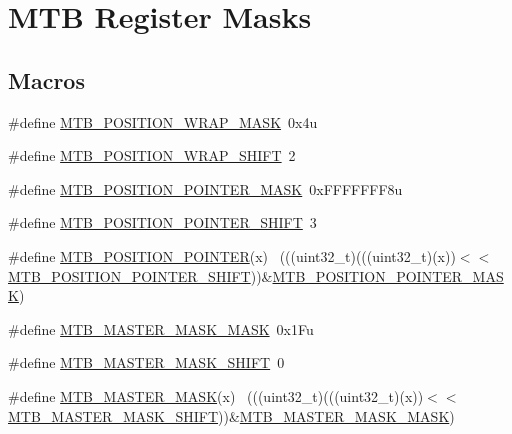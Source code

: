 \hypertarget{group___m_t_b___register___masks}{}\section{M\+TB Register Masks}
\label{group___m_t_b___register___masks}
\subsection*{Macros}
\begin{DoxyCompactItemize}
\item 
\#define \hyperlink{group___m_t_b___register___masks_ga78e2e577559e338f1c3b58cc1cc63805}{M\+T\+B\+\_\+\+P\+O\+S\+I\+T\+I\+O\+N\+\_\+\+W\+R\+A\+P\+\_\+\+M\+A\+SK}~0x4u
\item 
\#define \hyperlink{group___m_t_b___register___masks_gab3f7a88c57218b9c54796e7d2f41ac2f}{M\+T\+B\+\_\+\+P\+O\+S\+I\+T\+I\+O\+N\+\_\+\+W\+R\+A\+P\+\_\+\+S\+H\+I\+FT}~2
\item 
\#define \hyperlink{group___m_t_b___register___masks_gadb8fe67da29e5443d81624d913c6a5da}{M\+T\+B\+\_\+\+P\+O\+S\+I\+T\+I\+O\+N\+\_\+\+P\+O\+I\+N\+T\+E\+R\+\_\+\+M\+A\+SK}~0x\+F\+F\+F\+F\+F\+F\+F8u
\item 
\#define \hyperlink{group___m_t_b___register___masks_ga7857f68d5a75794dbf744b3c484f782f}{M\+T\+B\+\_\+\+P\+O\+S\+I\+T\+I\+O\+N\+\_\+\+P\+O\+I\+N\+T\+E\+R\+\_\+\+S\+H\+I\+FT}~3
\item 
\#define \hyperlink{group___m_t_b___register___masks_gaa861063b1241cda928116240e2c8a7fd}{M\+T\+B\+\_\+\+P\+O\+S\+I\+T\+I\+O\+N\+\_\+\+P\+O\+I\+N\+T\+ER}(x)                                ~(((uint32\+\_\+t)(((uint32\+\_\+t)(x))$<$$<$\hyperlink{group___m_t_b___register___masks_ga7857f68d5a75794dbf744b3c484f782f}{M\+T\+B\+\_\+\+P\+O\+S\+I\+T\+I\+O\+N\+\_\+\+P\+O\+I\+N\+T\+E\+R\+\_\+\+S\+H\+I\+FT}))\&\hyperlink{group___m_t_b___register___masks_gadb8fe67da29e5443d81624d913c6a5da}{M\+T\+B\+\_\+\+P\+O\+S\+I\+T\+I\+O\+N\+\_\+\+P\+O\+I\+N\+T\+E\+R\+\_\+\+M\+A\+SK})
\item 
\#define \hyperlink{group___m_t_b___register___masks_ga718f776541b94b2e942aac9479a60963}{M\+T\+B\+\_\+\+M\+A\+S\+T\+E\+R\+\_\+\+M\+A\+S\+K\+\_\+\+M\+A\+SK}~0x1\+Fu
\item 
\#define \hyperlink{group___m_t_b___register___masks_gad437c892ab8b61d2ffb4cd86dd2aa9b5}{M\+T\+B\+\_\+\+M\+A\+S\+T\+E\+R\+\_\+\+M\+A\+S\+K\+\_\+\+S\+H\+I\+FT}~0
\item 
\#define \hyperlink{group___m_t_b___register___masks_gaf67b0520a4f0ddadfd1268611b3e919c}{M\+T\+B\+\_\+\+M\+A\+S\+T\+E\+R\+\_\+\+M\+A\+SK}(x)                                          ~(((uint32\+\_\+t)(((uint32\+\_\+t)(x))$<$$<$\hyperlink{group___m_t_b___register___masks_gad437c892ab8b61d2ffb4cd86dd2aa9b5}{M\+T\+B\+\_\+\+M\+A\+S\+T\+E\+R\+\_\+\+M\+A\+S\+K\+\_\+\+S\+H\+I\+FT}))\&\hyperlink{group___m_t_b___register___masks_ga718f776541b94b2e942aac9479a60963}{M\+T\+B\+\_\+\+M\+A\+S\+T\+E\+R\+\_\+\+M\+A\+S\+K\+\_\+\+M\+A\+SK})

\end{DoxyCompactItemize}
